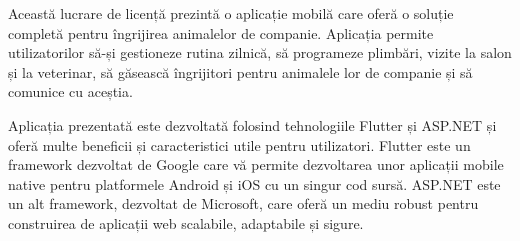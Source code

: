 Această lucrare de licență prezintă o aplicație mobilă care oferă o soluție completă pentru îngrijirea animalelor de companie. Aplicația permite utilizatorilor să-și gestioneze rutina zilnică, să programeze plimbări, vizite la salon și la veterinar, să găsească îngrijitori pentru animalele lor de companie și să comunice cu aceștia.

Aplicația prezentată este dezvoltată folosind tehnologiile Flutter\cite{flutter_for_beginners} și ASP.NET\cite{introducing_asp_net_mvc} și oferă multe beneficii și caracteristici utile pentru utilizatori. Flutter este un framework dezvoltat de Google care vă permite dezvoltarea unor aplicații mobile native pentru platformele Android și iOS cu un singur cod sursă. ASP.NET este un alt framework, dezvoltat de Microsoft, care oferă un mediu robust pentru construirea de aplicații web scalabile\cite{flutter_framework}, adaptabile și sigure.